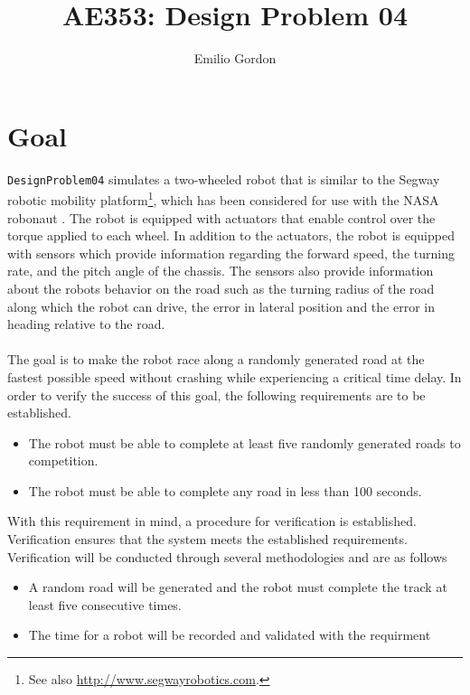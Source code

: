 \documentclass[12pt]{article}
\title{AE353: Design Problem 04}
\author{Emilio Gordon}
\begin{document}
\maketitle

\section{Goal}
\lstinline!DesignProblem04! simulates a two-wheeled robot that is similar to the Segway robotic mobility platform\footnote{See also \url{http://www.segwayrobotics.com}.}, which has been considered for use with the NASA robonaut \cite{murray}.  The robot is equipped with actuators that enable control over the torque applied to each wheel. In addition to the actuators, the robot is equipped with sensors which provide information regarding the forward speed, the turning rate, and the pitch angle of the chassis. The sensors also provide information about the robots behavior on the road such as the turning radius of the road along which the robot can drive, the error in lateral position and the error in heading relative to the road. 
\\ \\
The goal is to make the robot race along a randomly generated road at the fastest possible speed without crashing while experiencing a critical time delay. In order to verify the success of this goal, the following requirements are to be established.
\begin{itemize}
\item The robot must be able to complete at least five randomly generated roads to competition.
\item The robot must be able to complete any road in less than 100 seconds.
\end{itemize}
With this requirement in mind, a procedure for verification is established. Verification ensures that the system meets the established requirements. Verification will be conducted through several methodologies and are as follows
\begin{itemize}
\item A random road will be generated and the robot must complete the track at least five consecutive times.
\item The time for a robot will be recorded and validated with the requirment
\end{itemize}
\end{document}
